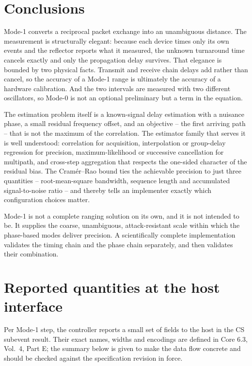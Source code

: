 \documentclass[11pt,a4paper]{article}
\begin{document}
\section{Conclusions}

Mode-1 converts a reciprocal packet exchange into an unambiguous distance. The measurement is
structurally elegant: because each device times only its own events and the reflector reports what it
measured, the unknown turnaround time cancels exactly and only the propagation delay survives. That
elegance is bounded by two physical facts. Transmit and receive chain delays add rather than cancel,
so the accuracy of a Mode-1 range is ultimately the accuracy of a hardware calibration. And the two
intervals are measured with two different oscillators, so Mode-0 is not an optional preliminary but
a term in the equation.

The estimation problem itself is a known-signal delay estimation with a nuisance phase, a small
residual frequency offset, and an objective -- the first arriving path -- that is not the maximum of
the correlation. The estimator family that serves it is well understood: correlation for acquisition,
interpolation or group-delay regression for precision, maximum-likelihood or successive cancellation
for multipath, and cross-step aggregation that respects the one-sided character of the residual bias.
The Cram\'er--Rao bound ties the achievable precision to just three quantities -- root-mean-square
bandwidth, sequence length and accumulated signal-to-noise ratio -- and thereby tells an implementer
exactly which configuration choices matter.

Mode-1 is not a complete ranging solution on its own, and it is not intended to be. It supplies the
coarse, unambiguous, attack-resistant scale within which the phase-based modes deliver precision. A
scientifically complete implementation validates the timing chain and the phase chain separately, and
then validates their combination.

\appendix
\section{Reported quantities at the host interface}
\label{app:hci}

Per Mode-1 step, the controller reports a small set of fields to the host in the CS subevent result.
Their exact names, widths and encodings are defined in Core 6.3, Vol.\ 4, Part E; the summary below
is given to make the data flow concrete and should be checked against the specification revision in
force.
\end{document}
